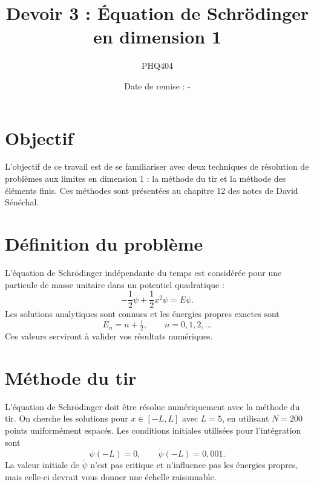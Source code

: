 \documentclass[12pt, letterpaper]{article}
\begin{document}
\title{Devoir 3 : Équation de Schrödinger en dimension 1}
\author{PHQ404}
\date{Date de remise : -}
\maketitle

\section{Objectif}\label{sec:objectif}

\noindent L’objectif de ce travail est de se familiariser avec deux techniques de résolution
de problèmes aux limites en dimension 1 : la méthode du tir et la méthode des éléments finis.
Ces méthodes sont présentées au chapitre 12 des notes de David Sénéchal.

\section{Définition du problème}\label{sec:definition-probleme}

\noindent L’équation de Schrödinger indépendante du temps est considérée pour une particule de masse unitaire dans
un potentiel quadratique :
\begin{equation}
	\label{eq:schrodinger}
	- \frac{1}{2} \ddot{\psi} + \frac{1}{2} x^2 \psi = E \psi.
\end{equation}
Les solutions analytiques sont connues et les énergies propres exactes sont
\begin{equation}
	E_n = n + \tfrac{1}{2}, \qquad n = 0,1,2,\dots
\end{equation}
Ces valeurs serviront à valider vos résultats numériques.

\section{Méthode du tir}\label{sec:methode-du-tir}

\noindent L'équation de Schrödinger doit être résolue numériquement avec la méthode du tir.
On cherche les solutions pour $x \in [-L,L]$ avec $L = 5$, en utilisant $N=200$ points uniformément espacés.
Les conditions initiales utilisées pour l'intégration sont
\begin{equation}
	\psi(-L) = 0, \qquad \dot{\psi}(-L) = 0{,}001.
\end{equation}
La valeur initiale de $\dot{\psi}$ n’est pas critique et n'influence pas les énergies propres,
mais celle-ci devrait vous donner une échelle raisonnable. \\
\end{document}
